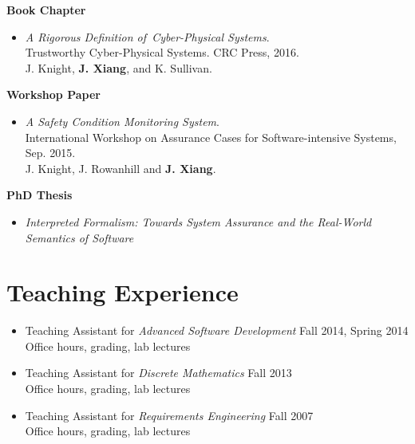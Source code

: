 \documentclass[11pt]{article}
\begin{document}
    
\textbf{Book Chapter}

\begin{itemize}
\item \textit{A Rigorous Definition of Cyber-Physical Systems}. \\
  Trustworthy Cyber-Physical Systems. CRC Press, 2016.\\
  J. Knight, \textbf{J. Xiang}, and K. Sullivan. 
\end{itemize}



\textbf{Workshop Paper}
\begin{itemize}
\item
  \textit{A Safety Condition Monitoring System}. \\
  International Workshop on Assurance Cases for Software-intensive Systems, Sep. 2015. \\
  J. Knight, J. Rowanhill and \textbf{J. Xiang}.
\end{itemize}  


\textbf{PhD Thesis}
\begin{itemize}
\item \textit{Interpreted Formalism: Towards System Assurance and the Real-World Semantics of Software}
\end{itemize}


\section{Teaching Experience}
\begin{itemize}
\item Teaching Assistant for \emph{Advanced Software Development} \hfill Fall 2014, Spring 2014 \\
  Office hours, grading, lab lectures
  
\item Teaching Assistant for \emph{Discrete Mathematics} \hfill Fall 2013 \\
  Office hours, grading, lab lectures

\item Teaching Assistant for \emph{Requirements Engineering} \hfill Fall 2007 \\
  Office hours, grading, lab lectures
\end{itemize}
\end{document}
